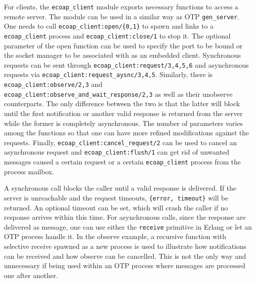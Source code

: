 For clients, the \verb|ecoap_client| module exports necessary functions to access a remote server. The module can be used in a similar way as OTP \verb|gen_server|. One needs to call \verb|ecoap_client:open/{0,1}| to spawn and links to a \verb|ecoap_client| process and \verb|ecoap_client:close/1| to stop it. The optional parameter of the open function can be used to specify the port to be bound or the socket manager to be associated with as an embedded client. Synchronous requests can be sent through \verb|ecoap_client:request/3,4,5,6| and asynchronous requests via \verb|ecoap_client:request_aysnc/3,4,5|. Similarly, there is \verb|ecoap_client:observe/2,3| and \verb|ecoap_client:observe_and_wait_response/2,3|  as well as their unobserve counterparts. The only difference between the two is that the latter will block until the first notification or another valid response is returned from the server while the former is completely asynchronous. The number of parameters varies among the functions so that one can have more refined modifications against the requests. Finally, \verb|ecoap_client:cancel_request/2| can be used to cancel an asynchronous request and \verb|ecoap_client:flush/1| can get rid of unwanted messages caused a certain request or a certain \verb|ecoap_client| process from the process mailbox. 


A synchronous call blocks the caller until a valid response is delivered. If the server is unreachable and the request timeouts, \verb|{error, timeout}| will be returned. An optional timeout can be set, which will crash the caller if no response arrives within this time. For asynchronous calls, since the response are delivered as message, one can use either the \verb|receive| primitive in Erlang or let an OTP process handle it. In the observe example, a recursive function with selective receive spawned as a new process is used to illustrate how notifications can be received and how observe can be cancelled. This is not the only way and unnecessary if being used within an OTP process where messages are processed one after another.

